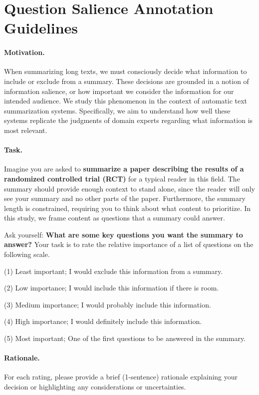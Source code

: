 \twocolumn
\section{Question Salience Annotation Guidelines}
\label{sec:appendix-annotation-guidelines}

\paragraph{Motivation.}
When summarizing long texts, we must consciously decide what information to include or exclude from a summary. These decisions are grounded in a notion of information salience, or how important we consider the information for our intended audience. We study this phenomenon in the context of automatic text summarization systems. Specifically, we aim to understand how well these systems replicate the judgments of domain experts regarding what information is most relevant.

\paragraph{Task.}
Imagine you are asked to \textbf{summarize a paper describing the results of a randomized controlled trial (RCT)} for a typical reader in this field. The summary should provide enough context to stand alone, since the reader will only see your summary and no other parts of the paper. Furthermore, the summary length is constrained, requiring you to think about what content to prioritize. In this study, we frame content as questions that a summary could answer.

Ask yourself: \textbf{What are some key questions you want the summary to answer?} Your task is to rate the relative importance of a list of questions on the following scale.
%
\begin{todolist}[noitemsep]
\item (1) Least important; I would exclude this information from a summary.
\item (2) Low importance; I would include this information if there is room.
\item (3) Medium importance; I would probably include this information.
\item (4) High importance; I would definitely include this information.
\item (5) Most important; One of the first questions to be answered in the summary.
\end{todolist}
%
\paragraph{Rationale.}
For each rating, please provide a brief (1-sentence) rationale explaining your decision or highlighting any considerations or uncertainties.

